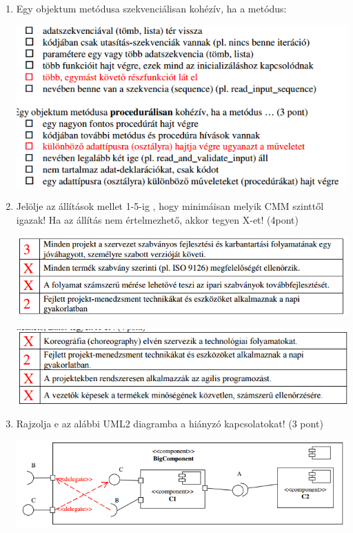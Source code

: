 \begin{enumerate}
	\item Egy objektum metódusa szekvenciálisan kohézív, ha a metódus:

		\begin{center}
			\includegraphics[scale=0.7]{img/table12}
		\end{center}

	\item Jelölje az állítások mellet 1-5-ig , hogy minimáisan melyik CMM szinttől igazak! Ha az állítás nem értelmezhető, akkor tegyen X-et! (4pont)

		\begin{center}
			\includegraphics[scale=0.7]{img/table13}
		\end{center}

		\begin{center}
			\includegraphics[scale=0.7]{img/table22}
		\end{center}

	\item Rajzolja e az alábbi UML2 diagramba a hiányzó kapcsolatokat! (3 pont)

		\begin{center}
			\includegraphics[scale=0.7]{img/table14}
		\end{center}


\end{enumerate}
